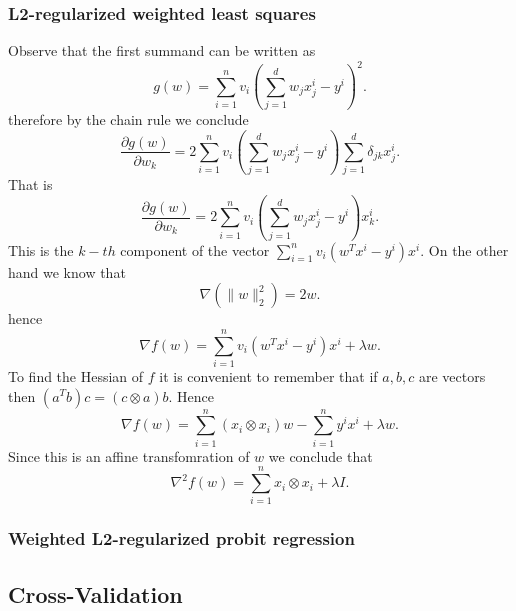 \documentclass[11pt]{article}
\theoremstyle{plain}
\begin{document}
\subsubsection{L2-regularized weighted least squares}
Observe that the first summand   can be written as
\begin{equation*}
g(w)=\sum_{i=1}^{n}v_{i}(\sum_{j=1}^{d}w_{j}x_{j}^{i}-y^{i})^{2}.
\end{equation*}
therefore by the chain rule we conclude
\begin{equation*}
\frac{\partial g(w)}{\partial w_{k}}=2\sum_{i=1}^{n}v_{i}(\sum_{j=1}^{d}w_{j}x_{j}^{i}-y^{i})\sum_{j=1}^{d}\delta_{jk}x_{j}^{i}.
\end{equation*}
That is
\begin{equation*}
\frac{\partial g(w)}{\partial w_{k}}=2\sum_{i=1}^{n}v_{i}(\sum_{j=1}^{d}w_{j}x_{j}^{i}-y^{i})x_{k}^{i}.
\end{equation*}
This is the $k-th$ component of the vector $\sum_{i=1}^{n}v_{i}(w^{T}x^{i}-y^{i})x^{i}$. On the other hand we know that
\begin{equation*}
\nabla(\|w\|_{2}^{2})=2w.
\end{equation*}
hence
\begin{equation*}
\nabla f(w)=\sum_{i=1}^{n}v_{i}(w^{T}x^{i}-y^{i})x^{i}+\lambda w.
\end{equation*}
To find the Hessian of $f$ it is convenient to remember that if $a,b,c$ are vectors then $(a^{T}b)c=(c\otimes a)b$.
Hence
\begin{equation*}
\nabla f(w)=\sum_{i=1}^{n}(x_{i}\otimes x_{i})w-\sum_{i=1}^{n}y^{i}x^{i}+\lambda w.
\end{equation*}
Since this is an affine transfomration of $w$ we conclude that
\begin{equation*}
\nabla^{2}f(w)=\sum_{i=1}^{n}x_{i}\otimes x_{i}+\lambda I.
\end{equation*}

\subsubsection{Weighted L2-regularized probit regression}



\newpage
\subsection{Cross-Validation}
\newpage
\end{document}
